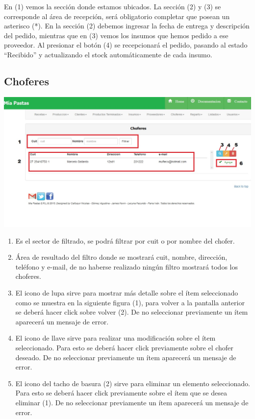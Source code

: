 \documentclass[letterpaper,10pt,english]{sphinxmanual}
\begin{document}
En (1) vemos la sección donde estamos ubicados. La sección (2) y (3) se corresponde al área de recepción, será obligatorio completar que posean un asterisco (*).  En la sección (2) debemos ingresar la fecha de entrega y descripción del pedido, mientras que en (3) vemos los insumos que hemos pedido a ese proveedor. Al presionar el botón (4) se recepcionará el pedido, pasando al estado “Recibido” y actualizando el stock automáticamente de cada insumo.


\subsection{{}Choferes}
\label{choferes::doc}\label{choferes:choferes}
\includegraphics{chofer_inicio.jpg}
\begin{enumerate}
\item {} 
Es el sector de filtrado, se podrá filtrar por cuit o por nombre del chofer.

\item {} 
Área de resultado del filtro donde se mostrará cuit, nombre, dirección, teléfono y e-mail, de no haberse realizado ningún filtro mostrará todos los choferes.

\item {} 
El icono de lupa sirve para mostrar más detalle sobre el ítem seleccionado como se muestra en la siguiente figura (1), para volver a la pantalla anterior se deberá hacer click sobre volver (2). De no seleccionar previamente un ítem aparecerá un mensaje de error.

\item {} 
El icono de llave sirve para realizar una modificación sobre el ítem seleccionado. Para esto se deberá hacer click previamente sobre el chofer deseado. De no seleccionar previamente un ítem aparecerá un mensaje de error.

\item {} 
El icono del tacho de basura (2) sirve para eliminar un elemento seleccionado. Para esto se deberá hacer click previamente sobre el ítem que se desea eliminar (1). De no seleccionar previamente un ítem aparecerá un mensaje de error.

\end{enumerate}
\end{document}
